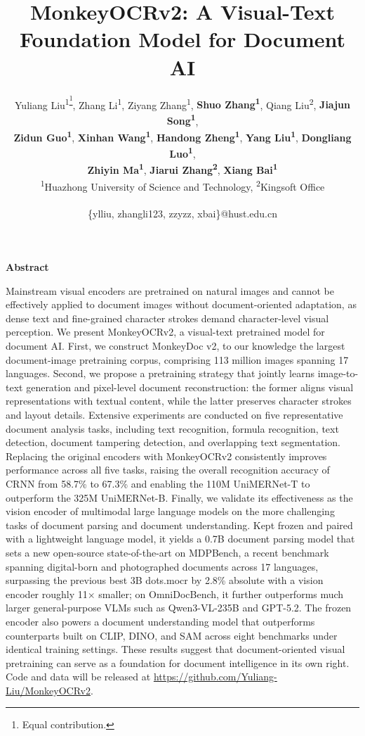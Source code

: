 \documentclass{article}
\title{MonkeyOCRv2: A Visual-Text Foundation Model for Document AI}
\author{
Yuliang Liu\textsuperscript{1\thanks{Equal contribution.}},
Zhang Li\textsuperscript{1\footnotemark[1]},
Ziyang Zhang\textsuperscript{1\footnotemark[1]},
\textbf{Shuo Zhang\textsuperscript{1\footnotemark[1]}},
Qiang Liu\textsuperscript{2},
\textbf{Jiajun Song\textsuperscript{1}},\\ %
 \textbf{Zidun Guo\textsuperscript{1}}, 
 \textbf{Xinhan Wang\textsuperscript{1}}, \textbf{Handong Zheng\textsuperscript{1}},
 \textbf{Yang Liu\textsuperscript{1}},  \textbf{Dongliang Luo\textsuperscript{1}}, 
 \\ \textbf{Zhiyin Ma\textsuperscript{1}}, \textbf{Jiarui Zhang\textsuperscript{2}}, \textbf{Xiang Bai\textsuperscript{1}} \\ %
[0.4em] 
\textsuperscript{1}Huazhong University of Science and Technology, \textsuperscript{2}Kingsoft Office\\[0.4em] 
  {\normalfont\ttfamily\small\begin{tabular}[t]{@{}c@{}}
  \{ylliu, zhangli123, zzyzz, xbai\}@hust.edu.cn
  \end{tabular}}
}
\renewenvironment{abstract}{%
  \vskip 0.075in%
  \centerline{\large\bf Abstract}%
  \vskip 0.075in%
  \noindent\ignorespaces%
}{%
  \vskip 0.1in%
}
\begin{document}
\maketitle
\thispagestyle{firstpage}  %

\begin{abstract}
    Mainstream visual encoders are pretrained on natural images and cannot be effectively applied to document images without document-oriented adaptation, as dense text and fine-grained character strokes demand character-level visual perception. We present MonkeyOCRv2, a visual-text pretrained model for document AI. First, we construct MonkeyDoc v2, to our knowledge the largest document-image pretraining corpus, comprising 113 million images spanning 17 languages. 
    Second, we propose a pretraining strategy that jointly learns image-to-text generation and pixel-level document reconstruction: the former aligns visual representations with textual content, while the latter preserves character strokes and layout details. Extensive experiments are conducted on five representative document analysis tasks, including text recognition, formula recognition, text detection, document tampering detection, and overlapping text segmentation. Replacing the original encoders with MonkeyOCRv2 consistently improves performance across all five tasks, raising the overall recognition accuracy of CRNN from 58.7\% to 67.3\% and enabling the 110M UniMERNet-T to outperform the 325M UniMERNet-B.
    Finally, we validate its effectiveness as the vision encoder of multimodal large language models on the more challenging tasks of document parsing and document understanding. Kept frozen and paired with a lightweight language model, it yields a 0.7B document parsing model that sets a new open-source state-of-the-art on MDPBench, a recent benchmark spanning digital-born and photographed documents across 17 languages, surpassing the previous best 3B dots.mocr by 2.8\% absolute with a vision encoder roughly 11$\times$ smaller; on OmniDocBench, it further outperforms much larger general-purpose VLMs such as Qwen3-VL-235B and GPT-5.2. The frozen encoder also powers a document understanding model that outperforms counterparts built on CLIP, DINO, and SAM across eight benchmarks under identical training settings. 
    These results suggest that document-oriented visual pretraining can serve as a foundation for document intelligence in its own right. Code and data will be released at \url{https://github.com/Yuliang-Liu/MonkeyOCRv2}.
\end{abstract}
\end{document}
